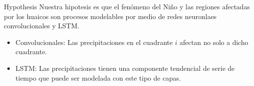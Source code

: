 \documentclass[10pt]{beamer}
\begin{document}
\begin{frame}{Hypothesis}
    Nuestra hipotesis es que el fenómeno del Niño y las regiones afectadas por los huaicos son procesos modelables por medio de redes neuronlaes convolucionales y LSTM.
    \begin{itemize}
        \item Convolucionales: Las precipitaciones en el cuadrante $i$ afectan no solo a dicho cuadrante.
        \item LSTM: Las precipitaciones tienen una componente tendencial de serie de tiempo que puede ser modelada con este tipo de capas.
    \end{itemize}
\end{frame}
\end{document}
